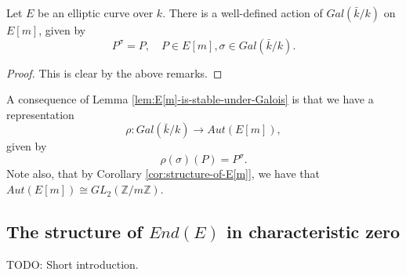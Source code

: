 \begin{lem}
  \label{lem:E[m]-is-stable-under-Galois}
  Let $E$ be an elliptic curve over $k$.  There is a well-defined action of
  $Gal(\bar{k} / k)$ on $E[m]$, given by
  \begin{equation*}
    P^{\sigma} = P, \quad P \in E[m], \sigma \in Gal(\bar{k} / k).
  \end{equation*}
\end{lem}
\begin{proof}
  This is clear by the above remarks.
\end{proof}

A consequence of Lemma \ref{lem:E[m]-is-stable-under-Galois} is that we have a
representation
\begin{equation*}
\rho : Gal(\bar{k} / k) \rightarrow Aut(E[m]),  
\end{equation*}
given by
\begin{equation}
  \label{eq:Galois-representation}
  \rho (\sigma) (P) = P^{\sigma}.
\end{equation}
Note also, that by Corollary \ref{cor:structure-of-E[m]}, we have that $Aut(E[m])
\cong GL_{2}(\mathbb{Z} / m \mathbb{Z})$.

\subsection{The structure of $End(E)$ in characteristic zero}
\label{sec:struct-ende-char-zero}

TODO: Short introduction.

